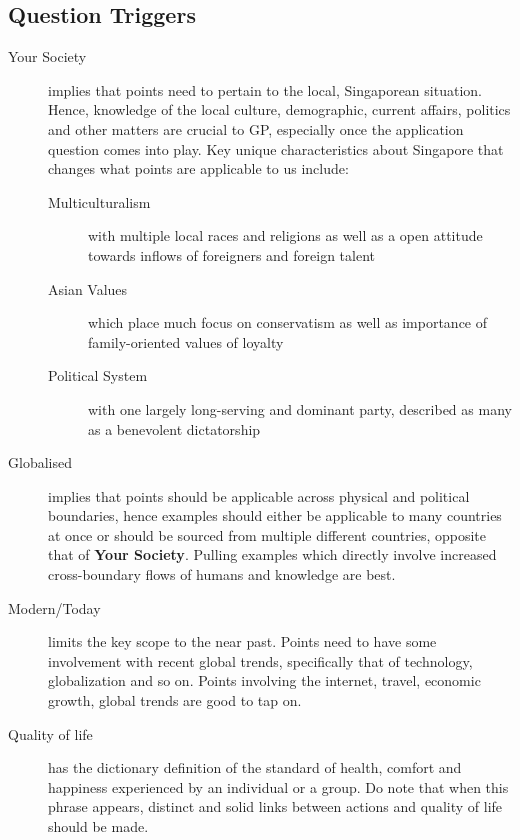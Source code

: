 \documentclass[../../main]{subfiles}
\begin{document}
\subsection{Question Triggers}

\begin{description}
	\item[Your Society] implies that points need to pertain to the local, Singaporean situation. Hence, knowledge of the local culture, demographic, current affairs, politics and other matters are crucial to GP, especially once the application question comes into play. Key unique characteristics about Singapore that changes what points are applicable to us include:
		\begin{description}
			\item[Multiculturalism] with multiple local races and religions as well as a open attitude towards inflows of foreigners and foreign talent
			\item[Asian Values] which place much focus on conservatism as well as importance of family-oriented values of loyalty
			\item[Political System] with one largely long-serving and dominant party, described as many as a benevolent dictatorship
		\end{description}
	\item[Globalised] implies that points should be applicable across physical and political boundaries, hence examples should either be applicable to many countries at once or should be sourced from multiple different countries, opposite that of \textbf{Your Society}. Pulling examples which directly involve increased cross-boundary flows of humans and knowledge are best.
	\item[Modern/Today] limits the key scope to the near past. Points need to have some involvement with recent global trends, specifically that of technology, globalization and so on. Points involving the internet, travel, economic growth, global trends are good to tap on.
	\item[Quality of life] has the dictionary definition of the standard of health, comfort and happiness experienced by an individual or a group. Do note that when this phrase appears, distinct and solid links between actions and quality of life should be made.
\end{description}
\end{document}
